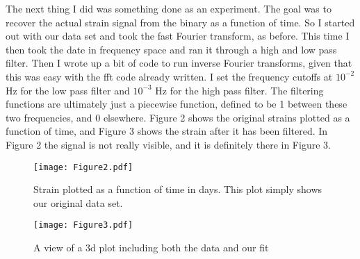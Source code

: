 \documentclass{article}
\begin{document}
The next thing I did was something done as an experiment. The goal was to recover the actual strain signal from the binary as a function of time. So I started out with our data set and took the fast Fourier transform, as before. This time I then took the date in frequency space and ran it through a high and low pass filter. Then I wrote up a bit of code to run inverse Fourier transforms, given that this was easy with the fft code already written. I set the frequency cutoffs at $10^{-2}$ Hz for the low pass filter and $10^{-3}$ Hz for the high pass filter. The filtering functions are ultimately just a piecewise function, defined to be 1 between these two frequencies, and 0 elsewhere. Figure 2 shows the original strains plotted as a function of time, and Figure 3 shows the strain after it has been filtered. In Figure 2 the signal is not really visible, and it is definitely there in Figure 3.\\



\begin{figure}[H]\label{fft}
  \begin{center}
  \texttt{[image: Figure2.pdf]}
  \caption{Strain plotted as a function of time in days. This plot simply shows our original data set.}
  \end{center}
\end{figure}



\begin{figure}[H]\label{f1}
  \begin{center}
  \texttt{[image: Figure3.pdf]}
  \caption{A view of a 3d plot including both the data and our fit}
  \end{center}
\end{figure}
\end{document}
